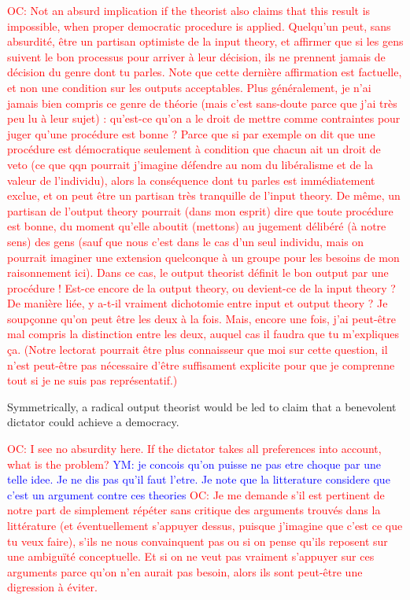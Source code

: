 \documentclass[preprint, french, english, 11pt]{elsarticle}%
\newcommand{\commentYM}[1]{\textcolor{blue}{YM: #1}}
\newcommand{\commentOC}[1]{\textcolor{red}{OC: #1}}
\begin{document}
\commentOC{Not an absurd implication if the
theorist also claims that this result is impossible, when
proper democratic procedure is applied. Quelqu’un peut, sans absurdité, être un partisan optimiste de la input theory, et affirmer que si les gens suivent le bon processus pour arriver à leur décision, ils ne prennent jamais de décision du genre dont tu parles. Note que cette dernière affirmation est factuelle, et non une condition sur les outputs acceptables. Plus généralement, je n’ai jamais bien compris ce genre de théorie (mais c’est sans-doute parce que j’ai très peu lu à leur sujet) : qu’est-ce qu’on a le droit de mettre comme contraintes pour juger qu’une procédure est bonne ? Parce que si par exemple on dit que une procédure est démocratique seulement à condition que chacun ait un droit de veto (ce que qqn pourrait j’imagine défendre au nom du libéralisme et de la valeur de l’individu), alors la conséquence dont tu parles est immédiatement exclue, et on peut être un partisan très tranquille de l’input theory. De même, un partisan de l’output theory pourrait (dans mon esprit) dire que toute procédure est bonne, du moment qu’elle aboutit (mettons) au jugement délibéré (à notre sens) des gens (sauf que nous c’est dans le cas d’un seul individu, mais on pourrait imaginer une extension quelconque à un groupe pour les besoins de mon raisonnement ici). Dans ce cas, le output theorist définit le bon output par une procédure ! Est-ce encore de la output theory, ou devient-ce de la input theory ? De manière liée, y a-t-il vraiment dichotomie entre input et output theory ? Je soupçonne qu’on peut être les deux à la fois. Mais, encore une fois, j’ai peut-être mal compris la distinction entre les deux, auquel cas il faudra que tu m’expliques ça. (Notre lectorat pourrait être plus connaisseur que moi sur cette question, il n’est peut-être pas nécessaire d’être suffisament explicite pour que je comprenne tout si je ne suis pas représentatif.)}

Symmetrically, a radical output theorist would be led to claim that a benevolent dictator could achieve a democracy. 

\commentOC{ I see no absurdity here. If the
dictator takes all preferences into account, what is the
problem?} 
\commentYM{je concois qu'on puisse ne pas etre choque par une telle idee. Je ne dis pas qu'il faut l'etre. Je note que la litterature considere que c'est un argument contre ces theories}
\commentOC{Je me demande s’il est pertinent de notre part de simplement répéter sans critique des arguments trouvés dans la littérature (et éventuellement s’appuyer dessus, puisque j’imagine que c’est ce que tu veux faire), s’ils ne nous convainquent pas ou si on pense qu’ils reposent sur une ambiguïté conceptuelle. Et si on ne veut pas vraiment s’appuyer sur ces arguments parce qu’on n’en aurait pas besoin, alors ils sont peut-être une digression à éviter.}
\end{document}
